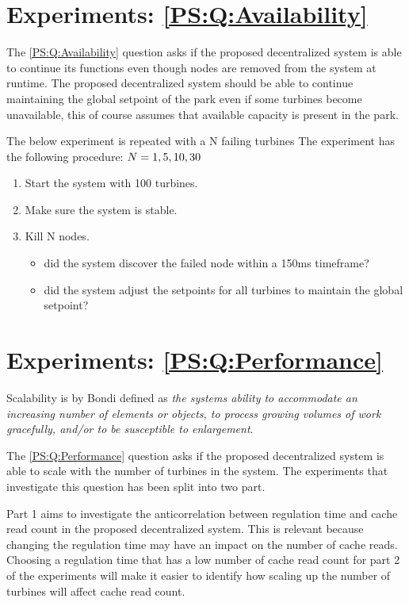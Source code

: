 \section{Experiments: \ref{PS:Q:Availability}}
The \ref{PS:Q:Availability} question asks if the proposed decentralized system is able to continue its functions even though nodes are removed from the system at runtime.
The proposed decentralized system should be able to continue maintaining the global setpoint of the park even if some turbines become unavailable, this of course assumes that available capacity is present in the park.

The below experiment is repeated with a N failing turbines
The experiment has the following procedure:
$N = 1, 5, 10, 30$
\begin{enumerate}
	\item Start the system with 100 turbines.
	\item Make sure the system is stable.
	\item Kill N nodes.
	\begin{itemize}
		\item did the system discover the failed node within a 150ms timeframe?
		\item did the system adjust the setpoints for all turbines to maintain the global setpoint?
	\end{itemize}
\end{enumerate}


\section{Experiments: \ref{PS:Q:Performance}}
Scalability is by Bondi\cite{Bondi:2000:CSI:350391.350432} defined as \textit{the systems ability to accommodate an increasing number of elements or objects, to process growing volumes of work gracefully, and/or to be susceptible to enlargement}.

The \ref{PS:Q:Performance} question asks if the proposed decentralized system is able to scale with the number of turbines in the system. The experiments that investigate this question has been split into two part. \newline

Part 1 aims to investigate the anticorrelation between regulation time and cache read count in the proposed decentralized system. This is relevant because changing the regulation time may have an impact on the number of cache reads. Choosing a regulation time that has a low number of cache read count for part 2 of the experiments will make it easier to identify how scaling up the number of turbines will affect cache read count. \newline

